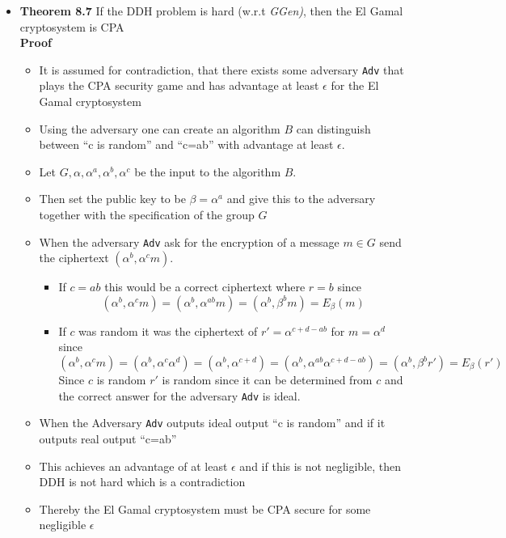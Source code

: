 \begin{itemize}
  \item \textbf{Theorem 8.7} If the DDH problem is hard (w.r.t \textit{GGen)}, then the El Gamal cryptosystem is CPA \smallskip \\
  \textbf{Proof}
  \begin{itemize}
   \item It is assumed for contradiction, that there exists some adversary \texttt{Adv} that plays the CPA security game and has advantage at least $\epsilon$ for the El Gamal cryptosystem
   \item Using the adversary one can create an algorithm $B$ can distinguish between ``c is random'' and ``c=ab'' with advantage at least $\epsilon$.
   \item Let $G, \alpha, \alpha^a, \alpha^b, \alpha^c$ be the input to the algorithm $B$.
   \item Then set the public key to be $\beta = \alpha^a$ and give this to the adversary together with the specification of the group $G$
   \item When the adversary \texttt{Adv} ask for the encryption of a message $m \in G$ send the ciphertext $(\alpha ^b, \alpha^c m)$. 
   \begin{itemize}
     \item If $c=ab$ this would be a correct ciphertext where $r=b$ since
     \begin{equation*}
       (\alpha ^b, \alpha^c m) = (\alpha^b, \alpha^{ab}m) = (\alpha^b, \beta^b m) = E_{\beta} (m)
     \end{equation*} 
     \item If $c$ was random it was the ciphertext of $r' = \alpha^{c+d-ab}$ for $m = \alpha^{d}$ since 
     \begin{equation*}
       (\alpha ^b, \alpha^c m) = (\alpha^b, \alpha^{c}\alpha^d) = (\alpha^b, \alpha^{c+d}) = (\alpha^b, \alpha^{ab}\alpha^{c+d-ab}) = (\alpha^b, \beta^br') = E_{\beta}(r')
     \end{equation*}
     Since $c$ is random $r'$ is random since it can be determined from $c$ and the correct answer for the adversary \texttt{Adv} is ideal.
   \end{itemize}
   \item When the Adversary \texttt{Adv} outputs ideal output ``c is random'' and if it outputs real output ``c=ab''
   \item This achieves an advantage of at least $\epsilon$ and if this is not negligible, then DDH is not hard which is a contradiction
   \item Thereby the El Gamal cryptosystem must be CPA secure for some negligible $\epsilon$
  \end{itemize}
\end{itemize}

